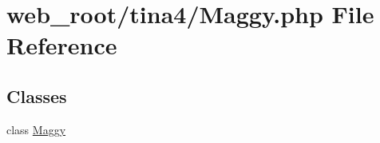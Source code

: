\hypertarget{Maggy_8php}{}\section{web\+\_\+root/tina4/\+Maggy.php File Reference}
\label{Maggy_8php}
\subsection*{Classes}
\begin{DoxyCompactItemize}
\item 
class \hyperlink{classMaggy}{Maggy}
\end{DoxyCompactItemize}
